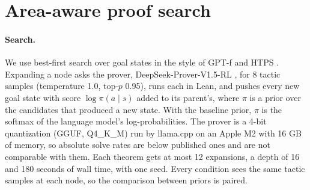 \section{Area-aware proof search}
\label{sec:search}

\paragraph{Search.}
We use best-first search over goal states in the style of GPT-f and HTPS
\citep{polu2020generative,lample2022hypertree}. Expanding a node asks the
prover, DeepSeek-Prover-V1.5-RL \citep{xin2025deepseekproverv15}, for 8
tactic samples (temperature 1.0, top-$p$ 0.95), runs each in Lean, and pushes
every new goal state with score $\log \pi(a \mid s)$ added to its parent's,
where $\pi$ is a prior over the candidates that produced a new state. With
the baseline prior, $\pi$ is the softmax of the language model's
log-probabilities. The prover is a 4-bit quantization (GGUF, Q4\_K\_M) run by
llama.cpp on an Apple M2 with 16 GB of memory, so absolute solve rates are
below published ones and are not comparable with them. Each theorem gets at
most 12 expansions, a depth of 16 and 180 seconds of wall time, with one
seed. Every condition sees the same tactic samples at each node, so the
comparison between priors is paired.

